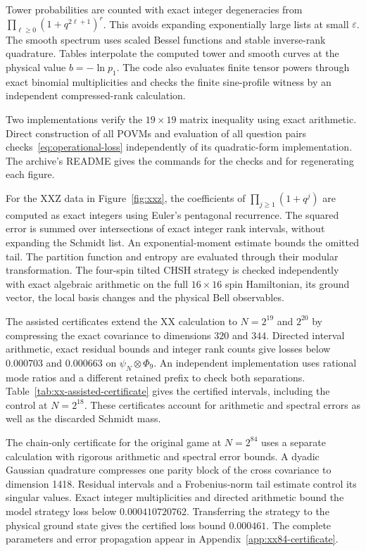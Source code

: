 Tower probabilities are counted with exact integer degeneracies from
$\prod_{\ell\ge0}(1+q^{2\ell+1})^r$. This avoids expanding exponentially
large lists at small $\varepsilon$. The smooth spectrum uses scaled
Bessel functions and stable inverse-rank quadrature. Tables interpolate
the computed tower and smooth curves at the physical value $b=-\ln p_1$.
The code also evaluates finite tensor powers through exact binomial
multiplicities and checks the finite sine-profile witness by an independent
compressed-rank calculation.

Two implementations verify the $19\times19$ matrix inequality using exact
arithmetic. Direct construction of all POVMs and evaluation of all
question pairs checks~\eqref{eq:operational-loss} independently of its
quadratic-form implementation. The archive's README gives the commands
for the checks and for regenerating each figure.

For the XXZ data in Figure~\ref{fig:xxz}, the coefficients of
$\prod_{j\ge1}(1+q^j)$ are computed as exact integers using Euler's
pentagonal recurrence. The squared error is summed over intersections
of exact integer rank intervals, without expanding the Schmidt list.
An exponential-moment estimate bounds the omitted tail. The partition
function and entropy are evaluated through their modular transformation.
The four-spin tilted CHSH strategy is checked independently with exact
algebraic arithmetic on the full $16\times16$ spin Hamiltonian, its ground
vector, the local basis changes and the physical Bell observables.

The assisted certificates extend the XX calculation to $N=2^{19}$ and
$2^{20}$ by compressing the exact covariance to dimensions $320$ and $344$.
Directed interval arithmetic, exact residual bounds and integer rank
counts give losses below $0.000703$ and $0.000663$ on
$\psi_N\otimes\Phi_9$. An independent implementation uses rational
mode ratios and a different retained prefix to check both separations.
Table~\ref{tab:xx-assisted-certificate} gives the certified intervals,
including the control at $N=2^{18}$. These certificates account for
arithmetic and spectral errors as well as the discarded Schmidt mass.

The chain-only certificate for the original game at $N=2^{84}$ uses a separate
calculation with rigorous arithmetic and spectral error bounds. A dyadic
Gaussian quadrature compresses one parity block of the cross covariance
to dimension 1418. Residual intervals and a Frobenius-norm tail estimate
control its singular values. Exact integer multiplicities and directed
arithmetic bound the model strategy loss below $0.000410720762$.
Transferring the strategy to the physical ground state gives the
certified loss bound $0.000461$. The complete parameters and error
propagation appear in Appendix~\ref{app:xx84-certificate}.
